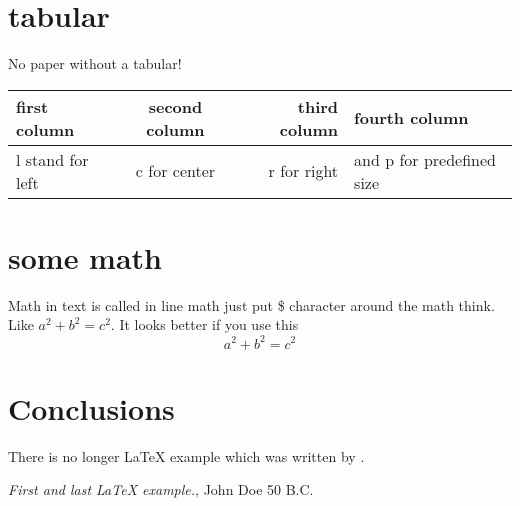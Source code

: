 \documentclass[11pt, a4paper, twoside, titlepage]{article}
\begin{document}
\section{tabular}
No paper without a tabular!

\begin{tabular}{|l|c|r|p{2cm}|}
\hline
first column & second column & third column & fourth column \\
\hline 
l stand for left & c for center & r for right & and p for predefined size \\
\hline 
\end{tabular} 


\section{some math}
Math in text is called in line math just put \$ character around 
the math think. Like $ a^2 + b^2 = c^2 $. It looks better if you use 
this 
\[a^2 + b^2 = c^2\]

\section{Conclusions}\label{conclusions}
There is no longer \LaTeX{} example which was written by \cite{doe}.

\begin{thebibliography}{9}
 \emph{First and last \LaTeX{} example.},
John Doe 50 B.C. 
\end{thebibliography}
\end{document}
